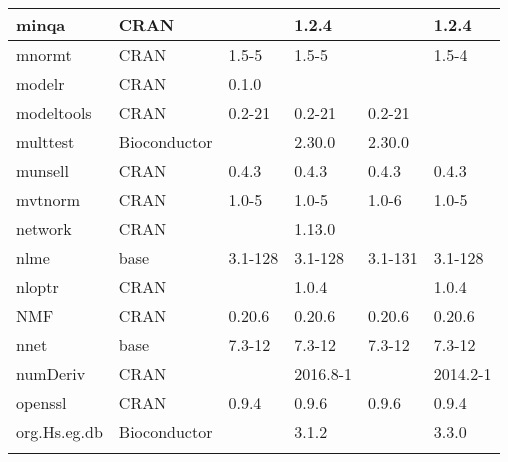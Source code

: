 \begin{longtable}{|llllll|}
minqa                         & CRAN                      &             & 1.2.4       &                & 1.2.4             \\ \hline \rowcolor{gray!25}
mnormt                        & CRAN                      & 1.5-5       & 1.5-5       &                & 1.5-4            \\ \hline
modelr                        & CRAN                      & 0.1.0       &             &                &                   \\ \hline \rowcolor{gray!25}
modeltools                    & CRAN                      & 0.2-21      & 0.2-21      & 0.2-21         &                  \\ \hline
multtest                      & Bioconductor              &             & 2.30.0      & 2.30.0         &                   \\ \hline \rowcolor{gray!25}
munsell                       & CRAN                      & 0.4.3       & 0.4.3       & 0.4.3          & 0.4.3            \\ \hline
mvtnorm                       & CRAN                      & 1.0-5       & 1.0-5       & 1.0-6          & 1.0-5             \\ \hline \rowcolor{gray!25}
network                       & CRAN                      &             & 1.13.0      &                &                  \\ \hline
nlme                          & base                      & 3.1-128     & 3.1-128     & 3.1-131        & 3.1-128           \\ \hline \rowcolor{gray!25}
nloptr                        & CRAN                      &             & 1.0.4       &                & 1.0.4            \\ \hline
NMF                           & CRAN                      & 0.20.6      & 0.20.6      & 0.20.6         & 0.20.6            \\ \hline \rowcolor{gray!25}
nnet                          & base                      & 7.3-12      & 7.3-12      & 7.3-12         & 7.3-12           \\ \hline
numDeriv                      & CRAN                      &             & 2016.8-1    &                & 2014.2-1          \\ \hline \rowcolor{gray!25}
openssl                       & CRAN                      & 0.9.4       & 0.9.6       & 0.9.6          & 0.9.4            \\ \hline
org.Hs.eg.db                  & Bioconductor              &             & 3.1.2       &                & 3.3.0             \\ \hline \rowcolor{gray!25}

\end{longtable}
